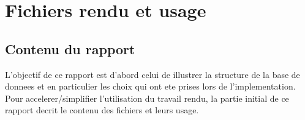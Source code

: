 \documentclass[twoside,openright,a4paper,11pt,french]{article}
\begin{document}
\pagestyle{plain}
\setlength{\parindent}{0pt}



\parskip=0pt
\tableofcontents


\vspace{5cm}


\section{Fichiers rendu et usage}
\subsection{Contenu du rapport}
L'objectif de ce rapport est d'abord celui de illustrer la structure de la base
de donnees et en particulier les choix qui ont ete prises lors de
l'implementation. Pour accelerer/simplifier l'utilisation du travail rendu, la
partie initial de ce rapport decrit le contenu des fichiers et leurs usage.
\end{document}
